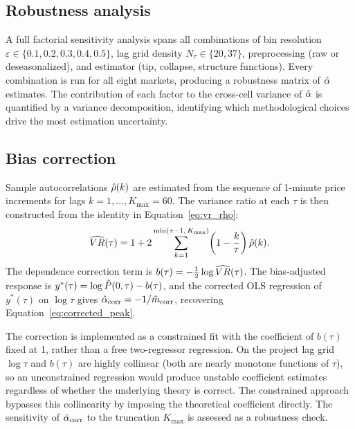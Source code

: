 \documentclass[12pt,a4paper]{article}
\begin{document}
\subsection{Robustness analysis}
\label{sec:methodology:robustness}

A full factorial sensitivity analysis spans all combinations of bin resolution
$\varepsilon\in\{0.1,0.2,0.3,0.4,0.5\}$, lag grid density $N_\tau\in\{20,37\}$,
preprocessing (raw or deseasonalized), and estimator (tip, collapse,
structure functions). Every combination is run for all eight markets, producing
a robustness matrix of $\hat{\alpha}$ estimates. The contribution of each factor to
the cross-cell variance of $\hat{\alpha}$ is quantified by a variance decomposition,
identifying which methodological choices drive the most estimation uncertainty.

\subsection{Bias correction}
\label{sec:methodology:bias}

Sample autocorrelations $\hat{\rho}(k)$ are estimated from the sequence of
1-minute price increments for lags $k = 1,\ldots,K_{\max} = 60$. The
variance ratio at each $\tau$ is then constructed from the identity
in Equation~\eqref{eq:vr_rho}:
\begin{equation}
  \widehat{VR}(\tau)
  = 1 + 2\sum_{k=1}^{\min(\tau-1,\,K_{\max})}\!
    \left(1 - \frac{k}{\tau}\right)\hat{\rho}(k).
  \label{eq:vr_hat}
\end{equation}
The dependence correction term is $b(\tau) = -\tfrac{1}{2}\log\widehat{VR}(\tau)$.
The bias-adjusted response is $y^*(\tau) = \log\hat{P}(0,\tau) - b(\tau)$, and
the corrected OLS regression of $y^*(\tau)$ on $\log\tau$ gives
$\hat{\alpha}_{\mathrm{corr}} = -1/\hat{m}_{\mathrm{corr}}$, recovering
Equation~\eqref{eq:corrected_peak}.

The correction is implemented as a constrained fit with the coefficient of
$b(\tau)$ fixed at 1, rather than a free two-regressor regression. On the
project lag grid $\log\tau$ and $b(\tau)$ are highly collinear (both are
nearly monotone functions of $\tau$), so an unconstrained regression would
produce unstable coefficient estimates regardless of whether the underlying
theory is correct. The constrained approach bypasses this collinearity by
imposing the theoretical coefficient directly. The sensitivity of
$\hat{\alpha}_{\mathrm{corr}}$ to the truncation $K_{\max}$ is assessed as a
robustness check.

\end{document}
